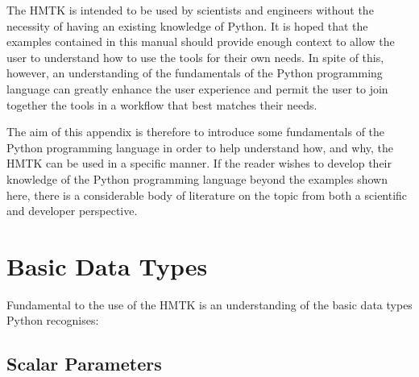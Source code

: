 The HMTK is intended to be used by scientists and engineers without the necessity of having an existing knowledge of Python. It is hoped that the examples contained in this manual should provide enough context to allow the user to understand how to use the tools for their own needs. In spite of this, however, an understanding of the fundamentals of the Python programming language can greatly enhance the user experience and permit the user to join together the tools in a workflow that best matches their needs. 

The aim of this appendix is therefore to introduce some fundamentals of the Python programming language in order to help understand how, and why, the HMTK can be used in a specific manner. If the reader wishes to develop their knowledge of the Python programming language beyond the examples shown here, there is a considerable body of literature on the topic from both a scientific and developer perspective.

\section{Basic Data Types}

Fundamental to the use of the HMTK is an understanding of the basic data types Python recognises:


\subsection{Scalar Parameters}

